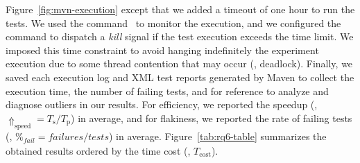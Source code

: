 Figure~\ref{fig:mvn-execution} except that we added a timeout of one
hour to run the tests. We used the 
command~\cite{timeout-cmd} to monitor the execution, and we configured
the command to dispatch a \emph{kill} signal if the test execution
exceeds the time limit. We imposed this time constraint to avoid
hanging indefinitely the experiment execution due to some thread
contention that may occur (\eg, deadlock). Finally, we saved each
execution log and XML test reports generated by Maven to collect the
execution time, the number of failing tests, and for reference to
analyze and diagnose outliers in our results. For efficiency, we
reported the speedup (\ie, $\Uparrow_\text{speed} = T_{\text{s}} /
T_{\text{p}}$) in average, and for flakiness, we reported the rate of
failing tests (\ie, $\mathit{\%_\text{fail} = failures / tests}$) in
average.  Figure~\ref{tab:rq6-table} summarizes the obtained results
ordered by the time cost (\ie, $T_\text{cost}$). 



